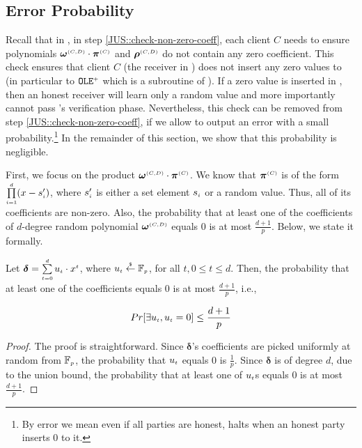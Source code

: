 

\subsection{Error Probability}\label{sec::error-prob}


Recall that in \fpsi, in step \ref{JUS::check-non-zero-coeff},  each client $C$ needs to ensure polynomials $\bm\omega^{\scriptscriptstyle (C,D)}\cdot \bm\pi^{\scriptscriptstyle  {  {(C)}}}$ and  $\bm\rho^{\scriptscriptstyle (C,D)}$ do not contain any zero coefficient. This check ensures that client $C$ (the receiver in \vopr) does not insert any zero values to  \vopr (in particular to $\mathtt{OLE}^{\scriptscriptstyle +}$ which is a subroutine of \vopr). If a zero value is inserted in \vopr, then an honest receiver will learn only a random value and more importantly cannot pass \vopr's verification phase. 
%
Nevertheless,  this check can be removed from step \ref{JUS::check-non-zero-coeff}, if we allow \fpsi to output an error with a small probability.\footnote{By error we mean even if all parties are honest,  \vopr halts when an honest party inserts $0$ to it.} In the remainder of this section, we show that this probability is negligible. 


First, we focus on the product $\bm\omega^{\scriptscriptstyle (C,D)}\cdot \bm\pi^{\scriptscriptstyle  {  {(C)}}}$. We know that $\bm\pi^{\scriptscriptstyle  {  {(C)}}}$ is of the form $\prod\limits^{\scriptscriptstyle d}_{\scriptscriptstyle i=1} (x-s'_{\scriptscriptstyle i})$, where $s'_{\scriptscriptstyle i}$ is either a set element $s_{\scriptscriptstyle i}$ or a random value.  Thus, all of its coefficients are non-zero. Also, the probability that at least one of the coefficients  of $d$-degree random polynomial $\bm\omega^{\scriptscriptstyle (C,D)}$ equals $0$ is at most $\frac{d+1}{p}$.  Below, we state it formally.


\begin{theorem}\label{theorem::zero-coeff-in-ran-poly}
Let $\bm\delta=\sum\limits_{\scriptscriptstyle t=0}^{\scriptscriptstyle d}u_{\scriptscriptstyle  t} \cdot x^{\scriptscriptstyle t}$, where  $u_{\scriptscriptstyle  t}\stackrel{\scriptscriptstyle\$}\leftarrow\mathbb{F}_{\scriptscriptstyle p}$, for all $t, 0\leq t\leq d$. Then, the probability that at least one of the coefficients equals $0$ is at most $\frac{d+1}{p}$, i.e., 

$$Pr[\exists u_{\scriptscriptstyle t}, u_{\scriptscriptstyle t}=0]\leq \frac{d+1}{p}$$
\end{theorem}


\begin{proof}
The proof is straightforward. Since $\bm\delta$'s coefficients are picked uniformly at random from  $\mathbb{F}_{\scriptscriptstyle p}$, the probability that $u_{\scriptscriptstyle t}$ equals $0$ is $\frac{1}{p}$. Since $\bm\delta$ is of degree $d$, due to the union bound, the probability that at least one of $u_{\scriptscriptstyle t}$s equals $0$ is at most $\frac{d+1}{p}$. 
%
 \end{proof}



